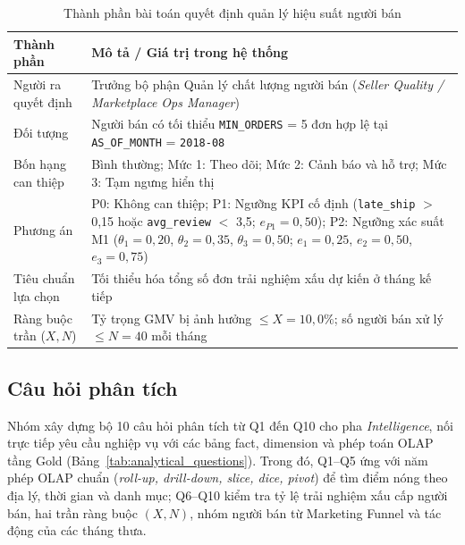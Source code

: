 \documentclass[a4paper]{article}
\begin{document}
\begin{table}[htbp]
\centering
\caption{Thành phần bài toán quyết định quản lý hiệu suất người bán}
\label{tab:decision_problem}
\begin{tabularx}{\textwidth}{lX}
\toprule
\textbf{Thành phần} & \textbf{Mô tả / Giá trị trong hệ thống} \\
\midrule
Người ra quyết định & Trưởng bộ phận Quản lý chất lượng người bán (\textit{Seller Quality / Marketplace Ops Manager}) \\
Đối tượng & Người bán có tối thiểu \texttt{MIN\_ORDERS} = 5 đơn hợp lệ tại \texttt{AS\_OF\_MONTH} = \texttt{2018-08} \\
Bốn hạng can thiệp & Bình thường; Mức 1: Theo dõi; Mức 2: Cảnh báo và hỗ trợ; Mức 3: Tạm ngưng hiển thị \\
Phương án & P0: Không can thiệp; P1: Ngưỡng KPI cố định (\texttt{late\_ship} $>$ 0,15 hoặc \texttt{avg\_review} $<$ 3,5; $e_{P1} = 0,50$); P2: Ngưỡng xác suất M1 ($\theta_1 = 0,20$, $\theta_2 = 0,35$, $\theta_3 = 0,50$; $e_1 = 0,25$, $e_2 = 0,50$, $e_3 = 0,75$) \\
Tiêu chuẩn lựa chọn & Tối thiểu hóa tổng số đơn trải nghiệm xấu dự kiến ở tháng kế tiếp \\
Ràng buộc trần ($X, N$) & Tỷ trọng GMV bị ảnh hưởng $\le X = 10,0\%$; số người bán xử lý $\le N = 40$ mỗi tháng \\
\bottomrule
\end{tabularx}
\end{table}

\subsection{Câu hỏi phân tích}
\label{subsec:1_3}

Nhóm xây dựng bộ 10 câu hỏi phân tích từ Q1 đến Q10 cho pha \textit{Intelligence}, nối trực tiếp yêu cầu nghiệp vụ với các bảng fact, dimension và phép toán OLAP tầng Gold (Bảng~\ref{tab:analytical_questions}). Trong đó, Q1--Q5 ứng với năm phép OLAP chuẩn (\textit{roll-up, drill-down, slice, dice, pivot}) để tìm điểm nóng theo địa lý, thời gian và danh mục; Q6--Q10 kiểm tra tỷ lệ trải nghiệm xấu cấp người bán, hai trần ràng buộc $(X, N)$, nhóm người bán từ Marketing Funnel và tác động của các tháng thưa.
\end{document}
